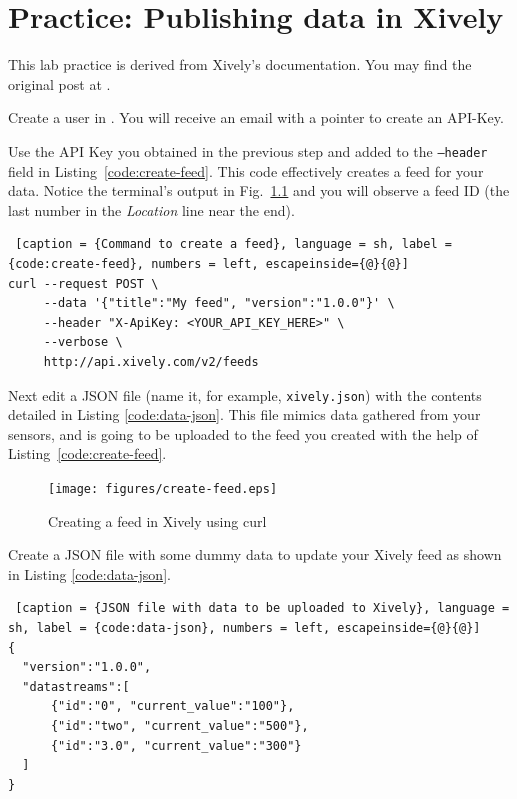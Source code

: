 \chapter{Practice: Publishing data in Xively}

This lab practice is derived from Xively's documentation. You may find the original post at \emph{}.

Create a user in \emph{} .
You will receive an email with a pointer to create an API-Key.

Use the API Key you obtained in the previous step and added to the \texttt{--header} field in Listing~\ref{code:create-feed}. This code effectively creates a feed for your data. Notice the terminal's output in Fig.~\ref{fig:create-feed} and you will observe a feed ID (the last number in the \emph{Location} line near the end).

\begin{lstlisting} [caption = {Command to create a feed}, language = sh, label = {code:create-feed}, numbers = left, escapeinside={@}{@}]
curl --request POST \
     --data '{"title":"My feed", "version":"1.0.0"}' \
     --header "X-ApiKey: <YOUR_API_KEY_HERE>" \
     --verbose \
     http://api.xively.com/v2/feeds

\end{lstlisting}

Next edit a JSON file (name it, for example, \texttt{xively.json}) with the contents detailed in Listing \ref{code:data-json}. This file mimics data gathered from your sensors, and is going to be uploaded to the feed you created with the help of Listing~\ref{code:create-feed}.

\begin{figure}[htbp]
  \centering
  \texttt{[image: figures/create-feed.eps]}
  \caption{Creating a feed in Xively using curl}
  \label{fig:create-feed}
\end{figure}

Create a JSON file with some dummy data to update your Xively feed as shown in Listing \ref{code:data-json}.

\begin{lstlisting} [caption = {JSON file with data to be uploaded to Xively}, language = sh, label = {code:data-json}, numbers = left, escapeinside={@}{@}]
{
  "version":"1.0.0",
  "datastreams":[
      {"id":"0", "current_value":"100"},
      {"id":"two", "current_value":"500"},
      {"id":"3.0", "current_value":"300"}
  ]
}
\end{lstlisting}

